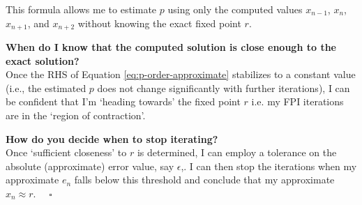 This formula allows me to estimate $p$ using only the computed values $x_{n-1}$, $x_n$, $x_{n+1}$, and $x_{n+2}$ without knowing the exact fixed point $r$.

\textbf{When do I know that the computed solution is close enough to the exact solution?}\\
Once the RHS of Equation \ref{eq:p-order-approximate} stabilizes to a constant value (i.e., the estimated $p$ does not change significantly with further iterations), I can be confident that I'm `heading towards' the fixed point $r$ i.e. my FPI iterations are in the `region of contraction'.

\textbf{How do you decide when to stop iterating?}\\
Once `sufficient closeness' to $r$ is determined, I can employ a tolerance on the absolute (approximate) error value, say $\epsilon$,. I can then stop the iterations when my approximate $e_n$ falls below this threshold and conclude that my approximate $x_n \approx r$. $\quad \square$